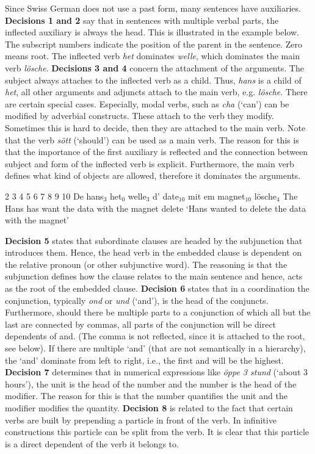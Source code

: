 \documentclass[11pt,letterpaper, covington]{article}
\begin{document}
Since Swiss German does not use a past form, many sentences have auxiliaries. \textbf{Decisions 1 and 2} say that in sentences with multiple verbal parts, the inflected auxiliary is always the head. This is illustrated in the example below. The subscript numbers indicate the position of the parent in the sentence. Zero means root. The inflected verb \emph{het} dominates \emph{welle}, which dominates the main verb \emph{lösche}. \textbf{Decisions 3 and 4} concern the attachment of the arguments. The subject always attaches to the inflected verb as a child. Thus, \emph{hans} is a child of \emph{het}, all other arguments and adjuncts attach to the main verb, e.g. \emph{lösche}. There are certain special cases. Especially, modal verbs, such as \emph{cha} (`can') can be modified by adverbial constructs. These attach to the verb they modify. Sometimes this is hard to decide, then they are attached to the main verb. Note that the verb \emph{sött} (`should') can be used as a main verb. The reason for this is that the importance of the first auxiliary is reflected and the connection between subject and form of the inflected verb is explicit. Furthermore, the main verb defines what kind of objects are allowed, therefore it dominates the arguments.

 2 3 4 5 6 7 8 9 10
De hans$_3$ het$_0$ welle$_3$ d' date$_{10}$ mit em magnet$_{10}$ lösche$_4$
The Hans has want the data with the magnet delete
\glt `Hans wanted to delete the data with the magnet'
\glend

\textbf{Decision 5} states that subordinate clauses are headed by the subjunction that introduces them. Hence, the head verb in the embedded clause is dependent on the relative pronoun (or other subjunctive word). The reasoning is that the subjunction defines how the clause relates to the main sentence and hence, acts as the root of the embedded clause.
\textbf{Decision 6} states that in a coordination the conjunction, typically \emph{ond} or \emph{und} (`and'), is the head of the conjuncts. Furthermore, should there be multiple parts to a conjunction of which all but the last are connected by commas, all parts of the conjunction will be direct dependents of and. (The comma is not reflected, since it is attached to the root, see below). If there are multiple `and' (that are not semantically in a hierarchy), the `and' dominate from left to right, i.e., the first and will be the highest.
\textbf{Decision 7} determines that in numerical expressions like \emph{öppe 3 stund} (`about 3 hours'), the unit is the head of the number and the number is the head of the modifier. The reason for this is that the number quantifies the unit and the modifier modifies the quantity.
\textbf{Decision 8} is related to the fact that certain verbs are built by prepending a particle in front of the verb. In infinitive constructions this particle can be split from the verb. It is clear that this particle is a direct dependent of the verb it belongs to.
\end{document}

